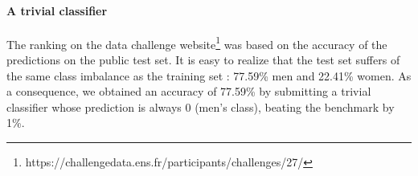 \paragraph{A trivial classifier} The ranking on the data challenge website\footnote{https://challengedata.ens.fr/participants/challenges/27/} was based on the accuracy of the predictions on the public test set. It is easy to realize that the test set suffers of the same class imbalance as the training set : 77.59\% men and 22.41\% women. As a consequence, we obtained an accuracy of 77.59\% by submitting a trivial classifier whose prediction is always 0 (men's class), beating the benchmark by 1\%. 
